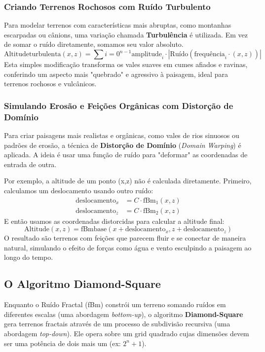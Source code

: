 \subsubsection{Criando Terrenos Rochosos com Ruído Turbulento}
Para modelar terrenos com características mais abruptas, como montanhas escarpadas ou cânions, uma variação chamada \textbf{Turbulência} é utilizada. Em vez de somar o ruído diretamente, somamos seu valor absoluto.
\begin{equation*}
\text{Altitude}{\text{turbulenta}}(x, z) = \sum{i=0}^{n-1} \text{amplitude}_i \cdot |\text{Ruído}(\text{frequência}_i \cdot (x, z))|
\end{equation*}
Esta simples modificação transforma os vales suaves em cumes afiados e ravinas, conferindo um aspecto mais "quebrado" e agressivo à paisagem, ideal para terrenos rochosos e vulcânicos.

\subsubsection{Simulando Erosão e Feições Orgânicas com Distorção de Domínio}
Para criar paisagens mais realistas e orgânicas, como vales de rios sinuosos ou padrões de erosão, a técnica de \textbf{Distorção de Domínio} (\textit{Domain Warping}) é aplicada. A ideia é usar uma função de ruído para "deformar" as coordenadas de entrada de outra.

Por exemplo, a altitude de um ponto (x,z) não é calculada diretamente. Primeiro, calculamos um deslocamento usando outro ruído:
\begin{align*}
    \text{deslocamento}_x &= C \cdot \text{fBm}_1(x, z) \\
    \text{deslocamento}_z &= C \cdot \text{fBm}_2(x, z)
\end{align*}
E então usamos as coordenadas distorcidas para calcular a altitude final:
\begin{equation*}
\text{Altitude}(x, z) = \text{fBm}{\text{base}}(x + \text{deslocamento}_x, z + \text{deslocamento}_z)
\end{equation*}
O resultado são terrenos com feições que parecem fluir e se conectar de maneira natural, simulando o efeito de forças como água e vento esculpindo a paisagem ao longo do tempo.

\subsection{O Algoritmo Diamond-Square}

Enquanto o Ruído Fractal (fBm) constrói um terreno somando ruídos em diferentes escalas (uma abordagem \textit{bottom-up}), o algoritmo \textbf{Diamond-Square} gera terrenos fractais através de um processo de subdivisão recursiva (uma abordagem \textit{top-down}). Ele opera sobre um grid quadrado cujas dimensões devem ser uma potência de dois mais um (ex: $2^n + 1$).

